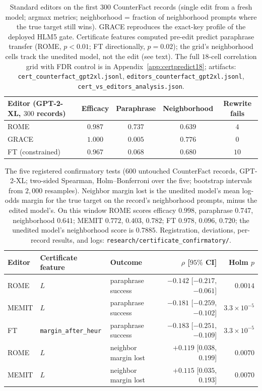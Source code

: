 \documentclass[11pt]{article}
\theoremstyle{remark}
\begin{document}
\begin{table}[t]
\centering\small
\begin{tabular}{l c c c c}
\toprule
Editor (GPT-2-XL, $300$ records) & Efficacy & Paraphrase & Neighborhood & Rewrite fails \\
\midrule
ROME & $0.987$ & $0.737$ & $0.639$ & $4$ \\
GRACE & $1.000$ & $0.005$ & $0.776$ & $0$ \\
FT (constrained) & $0.967$ & $0.068$ & $0.680$ & $10$ \\
\bottomrule
\end{tabular}
\caption{Standard editors on the first $300$ CounterFact records (single edit
from a fresh model; argmax metrics; neighborhood = fraction of neighborhood
prompts where the true target still wins). GRACE reproduces the exact-key
profile of the deployed HLM5 gate. Certificate features computed pre-edit
predict paraphrase transfer (ROME, $p<0.01$; FT directionally, $p=0.02$); the
grid's neighborhood cells track the unedited model, not the edit (see text).
The full $18$-cell correlation grid with FDR control is in
Appendix~\ref{app:certpredict18}; artifacts:
\texttt{cert\_counterfact\_gpt2xl.jsonl},
\texttt{editors\_counterfact\_gpt2xl.jsonl},
\texttt{cert\_vs\_editors\_analysis.json}.}
\label{tab:certpredict}
\end{table}

\begin{table}[t]
\centering\small
\begin{tabular}{l l l r r}
\toprule
Editor & Certificate feature & Outcome & $\rho$ [$95\%$ CI] & Holm $p$ \\
\midrule
ROME  & $L$ & paraphrase success & $-0.142$ [$-0.217$, $-0.061$] & $0.0014$ \\
MEMIT & $L$ & paraphrase success & $-0.181$ [$-0.259$, $-0.102$] & $3.3\times10^{-5}$ \\
FT    & \texttt{margin\_after\_heur} & paraphrase success & $-0.183$ [$-0.251$, $-0.109$] & $3.3\times10^{-5}$ \\
ROME  & $L$ & neighbor margin lost & $+0.119$ [$0.038$, $0.199$] & $0.0070$ \\
MEMIT & $L$ & neighbor margin lost & $+0.115$ [$0.035$, $0.193$] & $0.0070$ \\
\bottomrule
\end{tabular}
\caption{The five registered confirmatory tests ($600$ untouched CounterFact
records, GPT-2-XL; two-sided Spearman, Holm--Bonferroni over the five;
bootstrap intervals from $2{,}000$ resamples). Neighbor margin lost is the
unedited model's mean log-odds margin for the true target on the record's
neighborhood prompts, minus the edited model's. On this window ROME scores
efficacy $0.998$, paraphrase $0.747$, neighborhood $0.641$; MEMIT $0.772$,
$0.403$, $0.782$; FT $0.978$, $0.096$, $0.720$; the unedited model's
neighborhood score is $0.7885$. Registration, deviations, per-record results,
and logs: \texttt{research/certificate\_confirmatory/}.}
\label{tab:certconfirm}
\end{table}
\end{document}
